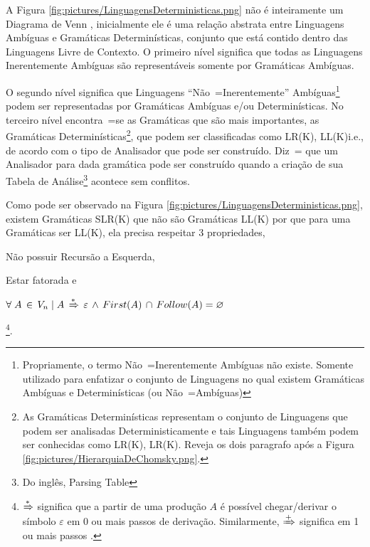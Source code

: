 {    A Figura \ref{fig:pictures/LinguagensDeterministicas.png} não é inteiramente um Diagrama de Venn \cite{generalizedVennDiagrams},
    inicialmente ele é uma relação abstrata entre Linguagens Ambíguas e
    Gramáticas Determinísticas,
    conjunto que está contido dentro das Linguagens Livre de Contexto.
    O primeiro nível significa que todas as Linguagens Inerentemente Ambíguas são representáveis somente por Gramáticas Ambíguas.

    O segundo nível significa que Linguagens ``Não~=Inerentemente'' Ambíguas\footnote{Propriamente,
    o termo Não~=Inerentemente Ambíguas não existe.
    Somente utilizado para enfatizar o conjunto de Linguagens no qual existem Gramáticas Ambíguas e
    Determinísticas (ou Não~=Ambíguas)} podem ser representadas por Gramáticas Ambíguas e\slash{}ou Determinísticas.
    No terceiro nível encontra~=se as Gramáticas que são mais importantes,
    as Gramáticas Determinísticas\footnote{As Gramáticas Determinísticas representam o conjunto de Linguagens que podem ser analisadas Deterministicamente e
    tais Linguagens também podem ser conhecidas como LR(K),
    LR(K).
    Reveja os dois paragrafo após a Figura \ref{fig:pictures/HierarquiaDeChomsky.png}.},
    que podem ser classificadas como LR(K),
    LL(K)i.e.,
    de acordo com o tipo de Analisador que pode ser construído.
    Diz~= que um Analisador para dada gramática pode ser construído quando a criação de sua Tabela de Análise\footnote{Do inglês,
    Parsing Table} \cite{ahoCompilerDragonBook} acontece sem conflitos.

    Como pode ser observado na Figura \ref{fig:pictures/LinguagensDeterministicas.png},
    existem Gramáticas SLR(K) que não são Gramáticas LL(K) por que para uma Gramáticas ser LL(K),
    ela precisa respeitar 3 propriedades,
    \begin{inparaenum}
        \item Não possuir Recursão a Esquerda,
        \item Estar fatorada e
        \item $\forall\; A\, \in\, V_n\; |\; A\,
                \xRightarrow{*}\, \varepsilon\,
                \land\, First(A)\, \cap\, Follow(A) = \varnothing$
    \end{inparaenum}
    \cite{ahoCompilerDragonBook}\footnote{$\xRightarrow{*}$ significa que
    a partir de uma produção $A$ é possível chegar\slash{}derivar o
    símbolo $\varepsilon$ em 0 ou mais passos de derivação.
    Similarmente,
    $\xRightarrow{+}$ significa em 1 ou mais passos \cite{contextSensitiveParsing}.}.

}
